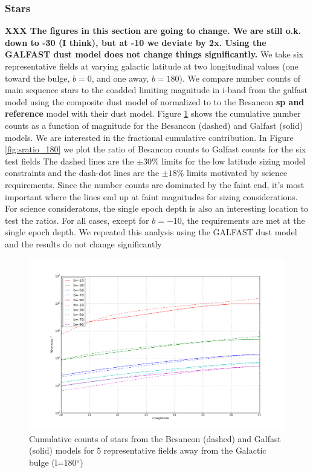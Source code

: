 \documentclass[]{article}
\begin{document}
\subsubsection{Stars}
{\bf XXX  The figures in this section are going to change.  We are still o.k. down to -30 (I think), but at -10 we deviate by 2x.  Using the GALFAST dust model
does not change things significantly.}
We take six representative fields at varying galactic latitude at two longitudinal values (one toward the bulge, $b=0$, and one away, $b=180$).  We compare number 
counts of main sequence stars to the coadded limiting magnitude in i-band 
 from the galfast model using the composite dust model
of \cite{amores} normalized to \cite{sfd} to the Besancon {\bf sp and reference} model with their dust model.  Figure \ref{fig:scounts_180} shows 
the cumulative number counts as a function of magnitude for the Besancon (dashed) and Galfast (solid) models.  We are interested in the
fractional cumulative contribution.  In Figure \ref{fig:sratio_180} we plot the ratio of Besancon counts to Galfast counts for the six test fields
The dashed lines are the $\pm30\%$ limits for the low latitude sizing model constraints and the dash-dot lines are the $\pm18\%$ limits motivated
by science requirements.  
Since the number counts are dominated by the faint end, it's most important where the lines end up at faint magnitudes for 
sizing considerations.  For science consideratons, the single epoch depth is also an interesting location to test the ratios.  For all cases, except
for $b=-10$, the 
requirements are met at the single epoch depth.   We repeated this analysis using the GALFAST dust model and the results do not change significantly
\begin{figure}
\centering
\includegraphics[width=5in]{validation_figures/cumulative_stars.png}
\caption{Cumulative counts of stars from the Besancon (dashed) and Galfast (solid) models for 5 representative fields away from the Galactic bulge (l=180$^o$) \label{fig:scounts_180}}
\end{figure}
\end{document}
